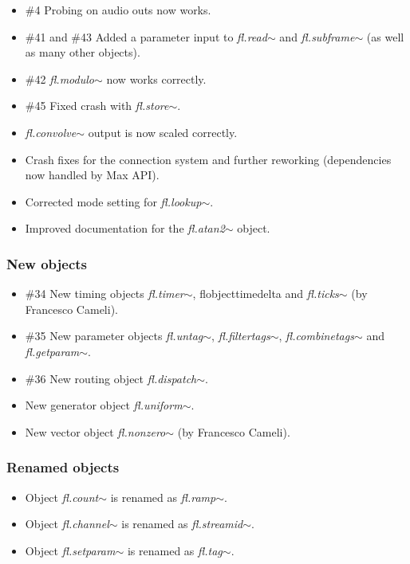 \documentclass{article}
\newcommand{\flobject}[1]{\textit{fl.#1$\sim$}}
\begin{document}
\begin{itemize}
\item {\#4} Probing on audio outs now works.
\item {\#41 and \#43} Added a parameter input to \flobject{read} and \flobject{subframe} (as well as many other objects).
\item {\#42} \flobject{modulo} now works correctly.
\item {\#45} Fixed crash with \flobject{store}.
\item \flobject{convolve} output is now scaled correctly.
\item Crash fixes for the connection system and further reworking (dependencies now handled by Max API).
\item Corrected mode setting for \flobject{lookup}.
\item Improved documentation for the \flobject{atan2} object.
\end{itemize}

\subsubsection{New objects}

\begin{itemize}
\item {\#34} New timing objects \flobject{timer}, flobject{timedelta} and \flobject{ticks} (by Francesco Cameli).
\item {\#35} New parameter objects \flobject{untag}, \flobject{filtertags}, \flobject{combinetags} and \flobject{getparam}.
\item {\#36} New routing object \flobject{dispatch}.
\item New generator object \flobject{uniform}.
\item New vector object \flobject{nonzero} (by Francesco Cameli).
\end{itemize}

\subsubsection{Renamed objects}

\begin{itemize}
\item Object \flobject{count} is renamed as \flobject{ramp}.
\item Object \flobject{channel} is renamed as \flobject{streamid}.
\item Object \flobject{setparam} is renamed as \flobject{tag}.
\end{itemize}
\end{document}
